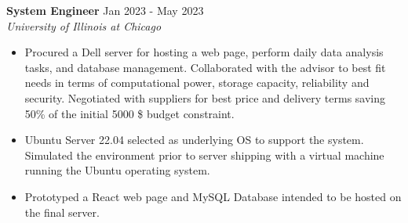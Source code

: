 
\noindent
\textbf{System Engineer} \hfill Jan 2023 - May 2023 \\
\textit{University of Illinois at Chicago}
\begin{itemize}[noitemsep,topsep=0pt]
    \item Procured a Dell server for hosting a web page, perform daily data analysis tasks, and database management. Collaborated with the advisor to best fit needs in terms of computational power, storage capacity, reliability and security. Negotiated with suppliers for best price and delivery terms saving 50\% of the initial 5000 \$ budget constraint.
    \item Ubuntu Server 22.04 selected as underlying OS to support the system. Simulated the environment prior to server shipping with a virtual machine running the Ubuntu operating system.
    \item Prototyped a React web page and MySQL Database intended to be hosted on the final server.
\end{itemize}

